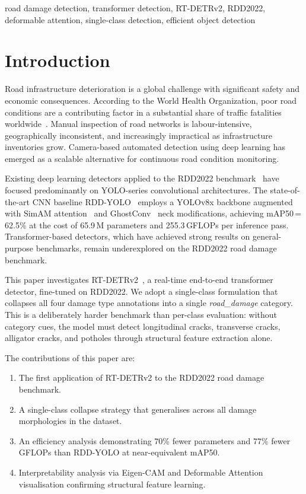 \documentclass[conference]{IEEEtran}
\begin{document}
\begin{IEEEkeywords}
road damage detection, transformer detection, RT-DETRv2, RDD2022, deformable attention,
single-class detection, efficient object detection
\end{IEEEkeywords}

\section{Introduction}

Road infrastructure deterioration is a global challenge with significant safety and
economic consequences.
According to the World Health Organization, poor road conditions are a contributing
factor in a substantial share of traffic fatalities worldwide~\cite{who2023roads}.
Manual inspection of road networks is labour-intensive, geographically inconsistent,
and increasingly impractical as infrastructure inventories grow.
Camera-based automated detection using deep learning has emerged as a scalable
alternative for continuous road condition monitoring.

Existing deep learning detectors applied to the RDD2022 benchmark~\cite{arya2022rdd}
have focused predominantly on YOLO-series convolutional architectures.
The state-of-the-art CNN baseline RDD-YOLO~\cite{rddyolo} employs a YOLOv8x backbone
augmented with SimAM attention~\cite{yang2021simam} and GhostConv~\cite{han2020ghost}
neck modifications, achieving mAP50\,=\,62.5\% at the cost of 65.9\,M parameters and
255.3\,GFLOPs per inference pass.
Transformer-based detectors, which have achieved strong results on general-purpose
benchmarks, remain underexplored on the RDD2022 road damage benchmark.

This paper investigates RT-DETRv2~\cite{chen2024rtdetrv2}, a real-time end-to-end
transformer detector, fine-tuned on RDD2022.
We adopt a single-class formulation that collapses all four damage type annotations
into a single \textit{road\_damage} category.
This is a deliberately harder benchmark than per-class evaluation: without category
cues, the model must detect longitudinal cracks, transverse cracks, alligator cracks,
and potholes through structural feature extraction alone.

The contributions of this paper are:
\begin{enumerate}
  \item The first application of RT-DETRv2 to the RDD2022 road damage benchmark.
  \item A single-class collapse strategy that generalises across all damage
        morphologies in the dataset.
  \item An efficiency analysis demonstrating 70\% fewer parameters and 77\% fewer
        GFLOPs than RDD-YOLO at near-equivalent mAP50.
  \item Interpretability analysis via Eigen-CAM and Deformable Attention
        visualisation confirming structural feature learning.
\end{enumerate}
\end{document}

